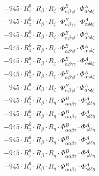 \documentclass{article}
\begin{document}
\begin{subequations}
\begin{gather}
\begin{array}{c}
 \\[0.2em] 		 - 945 \cdot R_{z}^{6} \cdot R_{\beta{}} \cdot R_{\zeta{}} \cdot \Phi{}^{B}_{\alpha{}\beta{}\gamma{}\delta{}} \cdot \Phi{}^{A}_{\alpha{}\gamma{}\delta{}\zeta{}} 
 \\[0.2em] 		 - 945 \cdot R_{z}^{6} \cdot R_{\beta{}} \cdot R_{\zeta{}} \cdot \Phi{}^{B}_{\alpha{}\beta{}\gamma{}\gamma{}} \cdot \Phi{}^{A}_{\alpha{}\delta{}\delta{}\zeta{}} 
 \\[0.2em] 		 - 945 \cdot R_{z}^{6} \cdot R_{\beta{}} \cdot R_{\zeta{}} \cdot \Phi{}^{B}_{\alpha{}\beta{}\gamma{}\delta{}} \cdot \Phi{}^{A}_{\alpha{}\gamma{}\delta{}\zeta{}} 
 \\[0.2em] 		 - 945 \cdot R_{z}^{6} \cdot R_{\beta{}} \cdot R_{\zeta{}} \cdot \Phi{}^{B}_{\alpha{}\beta{}\gamma{}\delta{}} \cdot \Phi{}^{A}_{\alpha{}\gamma{}\delta{}\zeta{}} 
 \\[0.2em] 		 - 945 \cdot R_{z}^{6} \cdot R_{\beta{}} \cdot R_{\zeta{}} \cdot \Phi{}^{B}_{\alpha{}\beta{}\gamma{}\gamma{}} \cdot \Phi{}^{A}_{\alpha{}\delta{}\delta{}\zeta{}} 
 \\[0.2em] 		 - 945 \cdot R_{z}^{6} \cdot R_{\beta{}} \cdot R_{\zeta{}} \cdot \Phi{}^{B}_{\alpha{}\beta{}\gamma{}\delta{}} \cdot \Phi{}^{A}_{\alpha{}\gamma{}\delta{}\zeta{}} 
 \\[0.2em] 		 - 945 \cdot R_{z}^{6} \cdot R_{\beta{}} \cdot R_{\zeta{}} \cdot \Phi{}^{B}_{\alpha{}\beta{}\gamma{}\delta{}} \cdot \Phi{}^{A}_{\alpha{}\gamma{}\delta{}\zeta{}} 
 \\[0.2em] 		 - 945 \cdot R_{z}^{6} \cdot R_{\beta{}} \cdot R_{\eta{}} \cdot \Phi{}^{B}_{\alpha{}\alpha{}\beta{}\gamma{}} \cdot \Phi{}^{A}_{\gamma{}\delta{}\delta{}\eta{}} 
 \\[0.2em] 		 - 945 \cdot R_{z}^{6} \cdot R_{\beta{}} \cdot R_{\eta{}} \cdot \Phi{}^{B}_{\alpha{}\alpha{}\beta{}\gamma{}} \cdot \Phi{}^{A}_{\gamma{}\delta{}\delta{}\eta{}} 
 \\[0.2em] 		 - 945 \cdot R_{z}^{6} \cdot R_{\beta{}} \cdot R_{\eta{}} \cdot \Phi{}^{B}_{\alpha{}\alpha{}\beta{}\gamma{}} \cdot \Phi{}^{A}_{\gamma{}\delta{}\delta{}\eta{}} 
 \\[0.2em] 		 - 945 \cdot R_{z}^{6} \cdot R_{\beta{}} \cdot R_{\eta{}} \cdot \Phi{}^{B}_{\alpha{}\alpha{}\beta{}\gamma{}} \cdot \Phi{}^{A}_{\gamma{}\delta{}\delta{}\eta{}} 
 \\[0.2em] 		 - 945 \cdot R_{z}^{6} \cdot R_{\beta{}} \cdot R_{\eta{}} \cdot \Phi{}^{B}_{\alpha{}\alpha{}\beta{}\gamma{}} \cdot \Phi{}^{A}_{\gamma{}\delta{}\delta{}\eta{}} 
 \\[0.2em] 		 - 945 \cdot R_{z}^{6} \cdot R_{\beta{}} \cdot R_{\eta{}} \cdot \Phi{}^{B}_{\alpha{}\alpha{}\beta{}\gamma{}} \cdot \Phi{}^{A}_{\gamma{}\delta{}\delta{}\eta{}} 

\end{array}
\end{gather}
\end{subequations}
\end{document}
